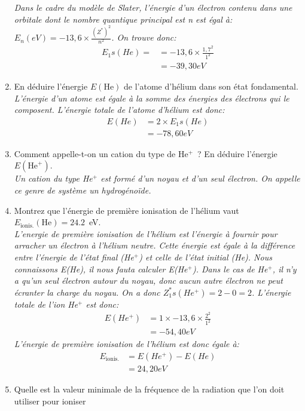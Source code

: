 \begin{enumerate}[\bf 1)]
\textsl{%
Dans le cadre du modèle de Slater, l'énergie d'un électron contenu dans une orbitale dont le
nombre quantique principal est n est égal à: $E_n (eV)= -13,6 \times \frac{(Z^*)^2}{n^2}$.
On trouve donc:
\begin{align*}
E_1s(He) = &= -13,6 \times \frac{1,7^2}{1^2}\\
           &= -39,30 eV
\end{align*}
}
\item En d\'eduire l'\'energie $E(\textrm{He})$ de l'atome d'h\'elium dans son \'etat fondamental.\\
\textsl{%
L'énergie d'un atome est égale à la somme des énergies des électrons qui le composent.
L'énergie totale de l'atome d'hélium est donc:
\begin{align*}
E(He) &= 2\times E_1s(He)\\
      &= -78,60 eV
\end{align*}
}
\item Comment appelle-t-on un cation du type de He$^+$~?  En d\'eduire l'\'energie $E(\textrm{He}^+)$.\\
\textsl{%
Un cation du type He$^+$ est formé d'un noyau et d'un seul électron.
On appelle ce genre de système un hydrogénoïde.
}
\item Montrez que l'\'energie de premi\`ere ionisation de l'h\'elium vaut $E_\textrm{ionis.}(\textrm{He})=24.2$~eV.\\
\textsl{%
L'energie de première ionisation de l'hélium est l'énergie à fournir pour arracher un
électron à l'hélium neutre.
Cette énergie est égale à la différence entre l'énergie de l'état final (He$^+$)
et celle de l'état initial (He).
Nous connaissons E(He), il nous fauta calculer E(He$^+$).
Dans le cas de He$^+$, il n'y a qu'un seul électron autour du noyau, donc aucun autre électron ne
peut écranter la charge du noyau. On a donc $Z^*_1s(He^+)= 2 - 0 = 2$.
L'énergie totale de l'ion He$^+$ est donc:
\begin{align*}
E(He^+) &= 1\times -13,6 \times \frac{2^2}{1^2}\\
        &= -54,40 eV
\end{align*}
L'énergie de première ionisation de l'hélium est donc égale à:
\begin{align*}
E_\text{ionis.} &= E(He^+) - E(He)\\
                &= 24,20 eV
\end{align*}
}
\item Quelle est la valeur minimale de la fr\'equence de la radiation que l'on doit utiliser pour ioniser 

\end{enumerate}
